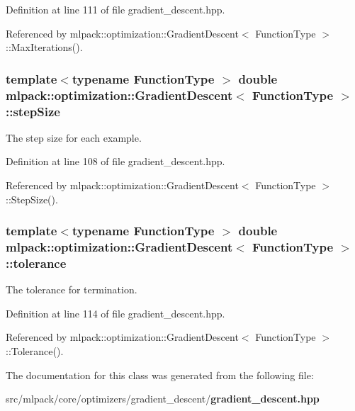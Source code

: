 Definition at line 111 of file gradient\+\_\+descent.\+hpp.



Referenced by mlpack\+::optimization\+::\+Gradient\+Descent$<$ Function\+Type $>$\+::\+Max\+Iterations().

\subsubsection[{step\+Size}]{\setlength{\rightskip}{0pt plus 5cm}template$<$typename Function\+Type $>$ double {\bf mlpack\+::optimization\+::\+Gradient\+Descent}$<$ Function\+Type $>$\+::step\+Size\hspace{0.3cm}{\ttfamily [private]}}\label{classmlpack_1_1optimization_1_1GradientDescent_a715079a2cf3184cae181d47afe4cbd42}


The step size for each example. 



Definition at line 108 of file gradient\+\_\+descent.\+hpp.



Referenced by mlpack\+::optimization\+::\+Gradient\+Descent$<$ Function\+Type $>$\+::\+Step\+Size().

\subsubsection[{tolerance}]{\setlength{\rightskip}{0pt plus 5cm}template$<$typename Function\+Type $>$ double {\bf mlpack\+::optimization\+::\+Gradient\+Descent}$<$ Function\+Type $>$\+::tolerance\hspace{0.3cm}{\ttfamily [private]}}\label{classmlpack_1_1optimization_1_1GradientDescent_a3e84efdf47853d628655a1750fb8523a}


The tolerance for termination. 



Definition at line 114 of file gradient\+\_\+descent.\+hpp.



Referenced by mlpack\+::optimization\+::\+Gradient\+Descent$<$ Function\+Type $>$\+::\+Tolerance().



The documentation for this class was generated from the following file\+:\begin{DoxyCompactItemize}
\item 
src/mlpack/core/optimizers/gradient\+\_\+descent/{\bf gradient\+\_\+descent.\+hpp}\end{DoxyCompactItemize}
